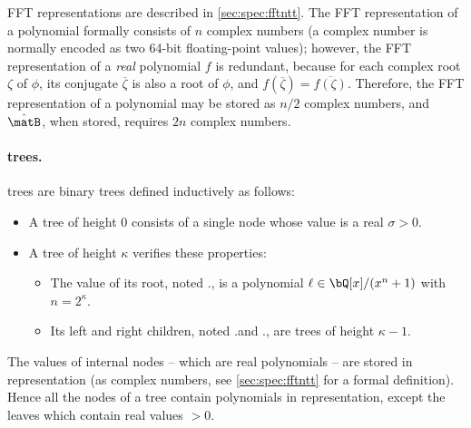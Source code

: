 FFT representations are described in \cref{sec:spec:fftntt}. The
FFT representation of a polynomial formally consists of $n$ complex
numbers (a complex number is normally encoded as two 64-bit
floating-point values); however, the FFT representation of a \emph{real}
polynomial $f$ is redundant, because for each complex root $\zeta$ of
$\phi$, its conjugate $\overline{\zeta}$ is also a root of $\phi$, and
$f(\overline{\zeta}) = \overline{f(\zeta)}$. Therefore, the FFT
representation of a polynomial may be stored as $n/2$ complex numbers,
and $\hat \matB$, when stored, requires $2n$ complex numbers.

\paragraph{\falcon trees.} \falcon trees are binary trees defined inductively as follows:
\begin{itemize}
 \item A \falcon tree \tree of height $0$ consists of a single node whose value is a real $\sigma > 0$.
 \item A \falcon tree \tree of height $\kappa$ verifies these properties:
 \begin{itemize}
  \item The value of its root, noted \tree.\data, is a polynomial $\ell \in \bQ[x]/(x^n+1)$ with $n = 2^\kappa$.
  \item Its left and right children, noted \tree.\lchild and \tree.\rchild, are \falcon trees of height $\kappa-1$.
 \end{itemize}
\end{itemize}
 The values of internal nodes -- which are real polynomials -- are stored in \fft representation (\ie as complex numbers, see \cref{sec:spec:fftntt} for a formal definition). Hence all the nodes of a \falcon tree contain polynomials in \fft representation, except the leaves which contain real values $>0$.

